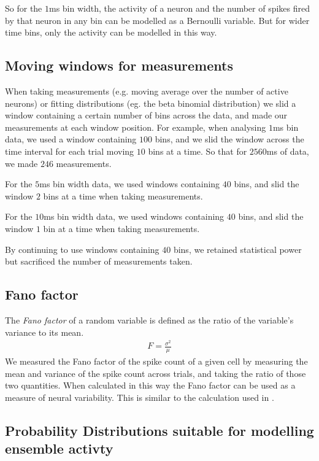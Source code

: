 \documentclass[a4paper,12pt]{article}
\theoremstyle{definition}
\begin{document}
    So for the $1$ms bin width, the activity of a neuron and the number of spikes fired by that neuron in any bin can be modelled as a Bernoulli variable. But for wider time bins, only the activity can be modelled in this way.

    \subsection{Moving windows for measurements}

    When taking measurements (e.g. moving average over the number of active neurons) or fitting distributions (eg. the beta binomial distribution) we slid a window containing a certain number of bins across the data, and made our measurements at each window position. For example, when analysing $1$ms bin data, we used a window containing $100$ bins, and we slid the window across the time interval for each trial moving $10$ bins at a time. So that for $2560$ms of data, we made $246$ measurements.

    For the $5$ms bin width data, we used windows containing $40$ bins, and slid the window $2$ bins at a time when taking measurements.

    For the $10$ms bin width data, we used windows containing $40$ bins, and slid the window $1$ bin at a time when taking measurements.
    
    By continuing to use windows containing $40$ bins, we retained statistical power but sacrificed the number of measurements taken. 

    \subsection{Fano factor}\label{sec:faco_factor}
    The \textit{Fano factor} of a random variable is defined as the ratio of the variable's variance to its mean. 
    \begin{align}\label{eq:fano_factor}
      F = \frac{\sigma^2}{\mu}
    \end{align}
    We measured the Fano factor of the spike count of a given cell by measuring the mean and variance of the spike count across trials, and taking the ratio of those two quantities. When calculated in this way the Fano factor can be used as a measure of neural variability.  This is similar to the calculation used in \cite{churchland}.

    \subsection{Probability Distributions suitable for modelling ensemble activty}
\end{document}
